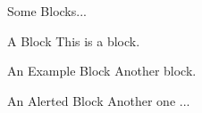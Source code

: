 \documentclass[t]{beamer} %
\begin{document}
\begin{frame}{Some Blocks...}
  \begin{block}{A Block}
    This is a block.
  \end{block}

  \begin{exampleblock}{An Example Block}
    Another block.
  \end{exampleblock}

  \begin{alertblock}{An Alerted Block}
    Another one ...
  \end{alertblock}
\end{frame}
\end{document}
